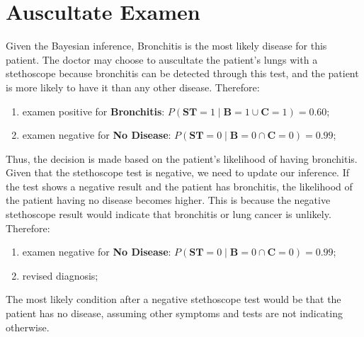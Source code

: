 \documentclass[../CSC_5RO11_TA_TP6.tex]{subfiles}
\begin{document}
\section{Auscultate Examen}
\noindent Given the Bayesian inference, Bronchitis is the most likely disease for this patient. The doctor may choose to auscultate the patient's lungs with a stethoscope because bronchitis can be detected through this test, and the patient is more likely to have it than any other disease. Therefore:
\begin{enumerate}[noitemsep]
    \item examen positive for \textbf{Bronchitis}: $P(\mathbf{ST} = 1\;|\;\mathbf{B} = 1 \cup \mathbf{C} = 1) = 0.60$;
    \item examen negative for \textbf{No Disease}: $P(\mathbf{ST} = 0\;|\;\mathbf{B} = 0 \cap \mathbf{C} = 0) = 0.99$;
\end{enumerate}
\noindent Thus, the decision is made based on the patient's likelihood of having bronchitis.\\

\noindent Given that the stethoscope test is negative, we need to update our inference. If the test shows a negative result and the patient has bronchitis, the likelihood of the patient having no disease becomes higher. This is because the negative stethoscope result would indicate that bronchitis or lung cancer is unlikely. Therefore:
\begin{enumerate}[noitemsep]
    \item examen negative for \textbf{No Disease}: $P(\mathbf{ST} = 0\;|\;\mathbf{B} = 0 \cap \mathbf{C} = 0) = 0.99$;
    \item revised diagnosis;
\end{enumerate}
\noindent The most likely condition after a negative stethoscope test would be that the patient has no disease, assuming other symptoms and tests are not indicating otherwise.
\end{document}
